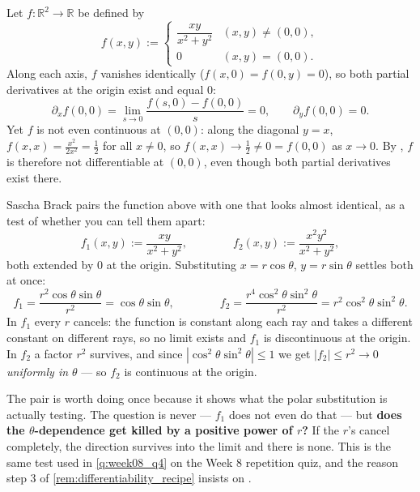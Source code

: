 \begin{aiexample}
\label{ex:partial_derivatives_not_continuous}
Let $f : \mathbb{R}^2 \to \mathbb{R}$ be defined by
\[f(x,y) := \begin{cases} \dfrac{xy}{x^2+y^2} & (x,y) \neq (0,0), \\ 0 & (x,y) = (0,0). \end{cases}\]
Along each axis, $f$ vanishes identically ($f(x,0) = f(0,y) = 0$), so both partial derivatives at
the origin exist and equal $0$:
\[\partial_x f(0,0) = \lim_{s\to 0}\frac{f(s,0)-f(0,0)}{s} = 0, \qquad \partial_y f(0,0) = 0.\]
Yet $f$ is not even continuous at $(0,0)$: along the diagonal $y=x$, $f(x,x) = \tfrac{x^2}{2x^2} =
\tfrac12$ for all $x \neq 0$, so $f(x,x) \to \tfrac12 \neq 0 = f(0,0)$ as $x \to 0$. By
, $f$ is therefore not differentiable at $(0,0)$,
even though both partial derivatives exist there.
\end{aiexample}

\begin{remark}
\label{rem:continuity_contrast_pair}
Sascha Brack pairs the function above with one that looks almost identical, as a test of whether
you can tell them apart:
\[f_1(x,y) := \frac{xy}{x^2+y^2}, \qquad\qquad f_2(x,y) := \frac{x^2y^2}{x^2+y^2},\]
both extended by $0$ at the origin. Substituting $x = r\cos\theta$, $y = r\sin\theta$ settles
both at once:
\[f_1 = \frac{r^2\cos\theta\sin\theta}{r^2} = \cos\theta\sin\theta,
\qquad\qquad
f_2 = \frac{r^4\cos^2\theta\sin^2\theta}{r^2} = r^2\cos^2\theta\sin^2\theta.\]
In $f_1$ every $r$ cancels: the function is constant along each ray and takes a different
constant on different rays, so no limit exists and $f_1$ is discontinuous at the origin. In
$f_2$ a factor $r^2$ survives, and since $|\cos^2\theta\sin^2\theta| \leq 1$ we get
$|f_2| \leq r^2 \to 0$ \emph{uniformly in $\theta$} --- so $f_2$ is continuous at the origin.

The pair is worth doing once because it shows what the polar substitution is actually testing.
The question is never  --- $f_1$ does
not even do that --- but \textbf{does the $\theta$-dependence get killed by a positive power of
$r$?} If the $r$'s cancel completely, the direction survives into the limit and there is none.
This is the same test used in \cref{q:week08_q4} on the Week 8 repetition quiz, and the reason
step 3 of \cref{rem:differentiability_recipe} insists on .
\end{remark}

